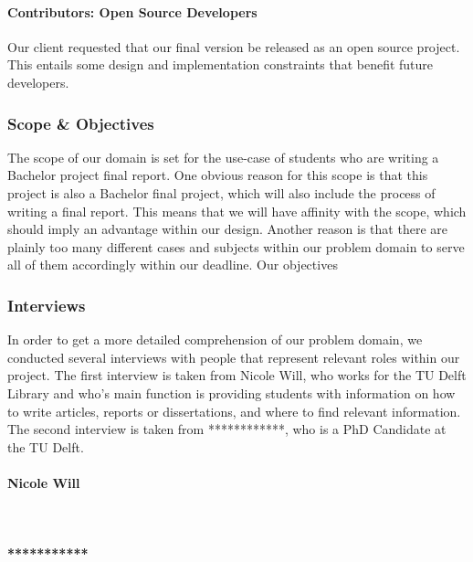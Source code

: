 \paragraph{Contributors: Open Source Developers} Our client requested that our final version be released as an open source project. This entails some design and implementation constraints that benefit future developers.

\subsubsection{Scope \& Objectives}

The scope of our domain is set for the use-case of students who are writing a Bachelor project final report. One obvious reason for this scope is that this project is also a Bachelor final project, which will also include the process of writing a final report. This means that we will have affinity with the scope, which should imply an advantage within our design. Another reason is that there are plainly too many different cases and subjects within our problem domain to serve all of them accordingly within our deadline.
Our objectives 

\subsubsection{Interviews} %

In order to get a more detailed comprehension of our problem domain, we conducted several
interviews with people that represent relevant roles within our project. The first interview
is taken from Nicole Will, who works for the TU Delft Library and who's main function is 
providing students with information on how to write articles, reports or dissertations, and where to find relevant information. The second interview is taken from ************, who is a PhD Candidate at the TU Delft.

\paragraph{Nicole Will} ~



\paragraph{***********}

 